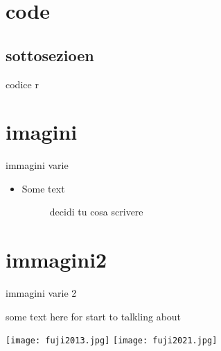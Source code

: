 \documentclass{beamer}
\begin{document}
\section{code}
\subsection{sottosezioen}

\begin{frame}{codice r}
\tiny 
    
\end{frame}

\section{imagini}

\begin{frame}{immagini varie}
 
\begin{itemize}
 
\item Some text

\bigskip
    
\begin{figure}
    \centering
    \qquad
    \caption{decidi tu cosa scrivere}
    \label{fig:my_label}
    
\end{figure}
\end{itemize}
    
\end{frame}

\section{immagini2}
\begin{frame}{immagini varie 2}

some text here for start to talkling about 
    
\centering
\texttt{[image: fuji2013.jpg]}
\texttt{[image: fuji2021.jpg]}

 \end{frame}
\end{document}
